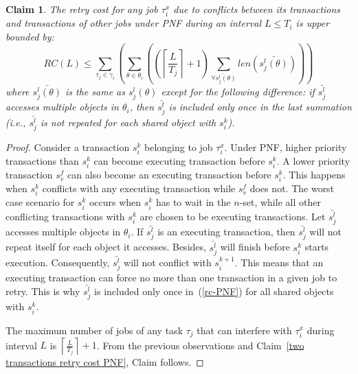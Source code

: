 \documentclass[12pt,english]{report}
\newtheorem{clm}{Claim}
\newtheorem{proof}{Proof}
\begin{document}
\begin{clm}
The retry cost for any job $\tau_{i}^{x}$ due to conflicts between its transactions and transactions of other jobs under PNF during an interval $L\le T_{i}$ is upper bounded by:
\begin{equation}
RC(L)\le\sum_{\tau_{j}\in\gamma_{i}}\left(\sum_{\theta\in\theta_{i}}\left(\left(\left\lceil \frac{L}{T_{j}}\right\rceil +1\right)\sum_{\bar{\forall s_{j}^{l}(\theta)}}len\left(\bar{s_{j}^{l}(\theta)}\right)\right)\right)\label{rc-PNF}
\end{equation}
where $\bar{s_{j}^{l}(\theta)}$ is the same as $s_{j}^{l}(\theta)$ except for the following difference:
 if $\bar{s_{j}^{l}}$ accesses multiple objects in $\theta_{i}$,
then $\bar{s_{j}^{l}}$ is included only once in the last summation (i.e., $\bar{s_j^l}$ is not repeated for each shared object with $s_i^k$).
\end{clm}
\begin{proof}\normalfont
Consider a transaction $s_{i}^{k}$ belonging to job $\tau_{i}^{x}$. Under PNF, higher priority transactions than $s_i^k$ can become executing transaction before $s_i^k$. A lower priority transaction $s_v^f$ can also become an executing transaction before $s_i^k$. This happens when $s_i^k$ conflicts with any executing transaction while $s_v^f$ does not. The worst case scenario for $s_{i}^{k}$ occurs when $s_i^k$ has to wait in the $n$-set, while all other conflicting transactions with $s_i^k$ are chosen to be executing transactions. 
Let $\bar{s_j^l}$ accesses multiple objects in $\theta_i$. If $\bar{s_j^l}$ is an executing transaction, then $\bar{s_j^l}$ will not repeat itself for each object it accesses. Besides, $\bar{s_j^l}$ will finish before $s_i^k$ starts execution. Consequently, $\bar{s_j^l}$ will not conflict with $s_i^{k+1}$. This means that an executing transaction can force no more than one transaction in a given job to retry. This is why $\bar{s_j^l}$ is included only once in~(\ref{rc-PNF}) for all shared objects with $s_i^k$.

The maximum number of jobs of any task $\tau_{j}$ that can interfere with $\tau_{i}^{x}$ during interval $L$ is $\left\lceil \frac{L}{T_{j}}\right\rceil +1$. From  the previous observations and Claim~\ref{two transactions retry cost PNF}, Claim follows.
\end{proof}
\end{document}
